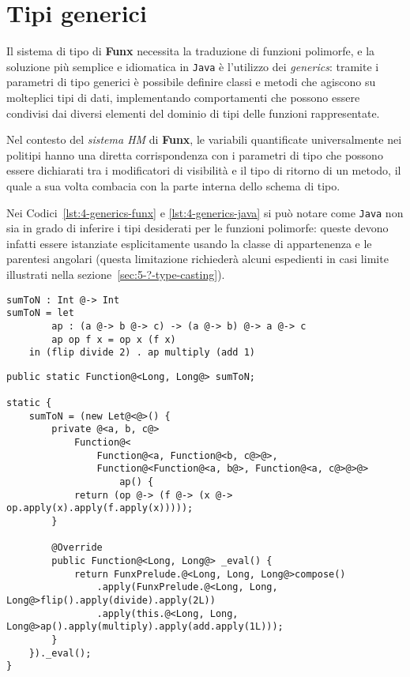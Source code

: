 \section{Tipi generici}
\label{sec:4-3-generics}

Il sistema di tipo di \textbf{Funx} necessita la traduzione di funzioni polimorfe,
e la soluzione più semplice e idiomatica in \texttt{Java} è l'utilizzo dei \textit{generics}:
tramite i parametri di tipo generici è possibile definire classi e metodi che agiscono su molteplici tipi di dati,
implementando comportamenti che possono essere condivisi dai diversi elementi del dominio di tipi delle funzioni rappresentate.

Nel contesto del \textit{sistema HM} di \textbf{Funx}, le variabili quantificate universalmente nei politipi
hanno una diretta corrispondenza con i parametri di tipo che possono essere dichiarati tra i modificatori di visibilità
e il tipo di ritorno di un metodo, il quale a sua volta combacia con la parte interna dello schema di tipo.

Nei Codici~\ref{lst:4-generics-funx} e \ref{lst:4-generics-java} si può notare come \texttt{Java} non sia in grado
di inferire i tipi desiderati per le funzioni polimorfe: queste devono infatti essere istanziate esplicitamente
usando la classe di appartenenza e le parentesi angolari (questa limitazione richiederà alcuni espedienti in casi limite
illustrati nella sezione~\ref{sec:5-?-type-casting}).

\vspace{4mm}
\begin{lstlisting}[caption={Scrittura e utilizzo di funzioni polimorfe in \textbf{Funx}}, style=funxCode, label={lst:4-generics-funx}]
sumToN : Int @-> Int
sumToN = let
        ap : (a @-> b @-> c) -> (a @-> b) @-> a @-> c
        ap op f x = op x (f x)
    in (flip divide 2) . ap multiply (add 1)
\end{lstlisting}
\vspace{4mm}
\begin{lstlisting}[caption={Corrispondente traduzione in \texttt{Java}}, style=javaCode, label={lst:4-generics-java}]
public static Function@<Long, Long@> sumToN;

static {
    sumToN = (new Let@<@>() {
        private @<a, b, c@>
            Function@<
                Function@<a, Function@<b, c@>@>,
                Function@<Function@<a, b@>, Function@<a, c@>@>@>
                    ap() {
            return (op @-> (f @-> (x @-> op.apply(x).apply(f.apply(x)))));
        }

        @Override
        public Function@<Long, Long@> _eval() {
            return FunxPrelude.@<Long, Long, Long@>compose()
                .apply(FunxPrelude.@<Long, Long, Long@>flip().apply(divide).apply(2L))
                .apply(this.@<Long, Long, Long@>ap().apply(multiply).apply(add.apply(1L)));
        }
    })._eval();
}  
\end{lstlisting}
